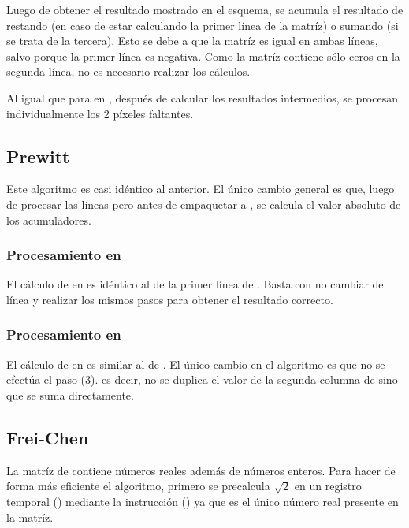 Luego de obtener el resultado mostrado en el esquema, se acumula el resultado de  restando (en caso de estar calculando la primer 
línea de la matríz) o sumando (si se trata de la tercera). Esto se debe a que la matríz es igual en ambas líneas, salvo porque la primer línea es 
negativa. Como la matríz contiene sólo ceros en la segunda línea, no es necesario realizar los cálculos.

Al igual que para  en , después de calcular los resultados intermedios, se procesan individualmente los 2 píxeles faltantes.

\vspace{5mm}
\subsection{Prewitt}
	Este algoritmo es casi idéntico al anterior. El único cambio general es que, luego de procesar las líneas pero antes
de empaquetar a , se calcula el valor absoluto de los acumuladores.
\subsubsection{Procesamiento en }
	El cálculo de  en  es idéntico al de la primer línea de . Basta con no cambiar de línea y realizar
los mismos pasos para obtener el resultado correcto.

\subsubsection{Procesamiento en }
	El cálculo de  en  es similar al de . El único cambio en el algoritmo es que no se efectúa el paso (3). 
es decir, no se duplica el valor de la segunda columna de  sino que se suma directamente.

\vspace{5mm}
\subsection{Frei-Chen}
	La matríz de  contiene números reales además de números enteros. Para hacer de forma más eficiente el algoritmo, 
primero se precalcula $\sqrt{2}$ en un registro temporal () mediante la instrucción  () ya que es el único número real presente en la matríz.

